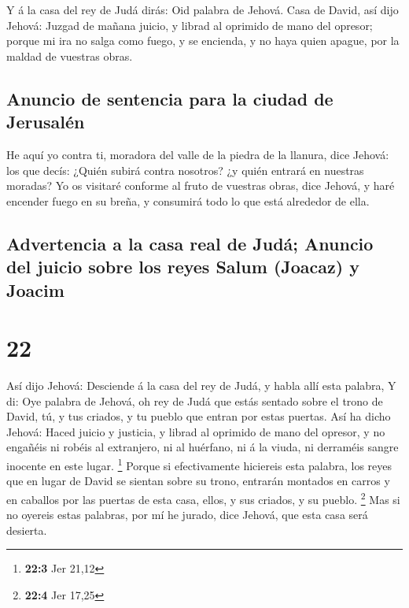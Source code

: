  Y á la casa del rey de Judá dirás: Oid palabra de Jehová.
 Casa de David, así dijo Jehová: Juzgad de mañana juicio, y
librad al oprimido de mano del opresor; porque mi ira no salga como
fuego, y se encienda, y no haya quien apague, por la maldad de vuestras
obras.

\hypertarget{anuncio-de-sentencia-para-la-ciudad-de-jerusaluxe9n}{%
\subsection{Anuncio de sentencia para la ciudad de
Jerusalén}\label{anuncio-de-sentencia-para-la-ciudad-de-jerusaluxe9n}}

 He aquí yo contra ti, moradora del valle de la piedra de
la llanura, dice Jehová: los que decís: ¿Quién subirá contra nosotros?
¿y quién entrará en nuestras moradas?  Yo os visitaré
conforme al fruto de vuestras obras, dice Jehová, y haré encender fuego
en su breña, y consumirá todo lo que está alrededor de ella.

\hypertarget{advertencia-a-la-casa-real-de-juduxe1-anuncio-del-juicio-sobre-los-reyes-salum-joacaz-y-joacim}{%
\subsection{Advertencia a la casa real de Judá; Anuncio del juicio sobre
los reyes Salum (Joacaz) y
Joacim}\label{advertencia-a-la-casa-real-de-juduxe1-anuncio-del-juicio-sobre-los-reyes-salum-joacaz-y-joacim}}

\hypertarget{section-21}{%
\section{22}\label{section-21}}

 Así dijo Jehová: Desciende á la casa del rey de Judá, y
habla allí esta palabra,  Y di: Oye palabra de Jehová, oh
rey de Judá que estás sentado sobre el trono de David, tú, y tus
criados, y tu pueblo que entran por estas puertas.  Así ha
dicho Jehová: Haced juicio y justicia, y librad al oprimido de mano del
opresor, y no engañéis ni robéis al extranjero, ni al huérfano, ni á la
viuda, ni derraméis sangre inocente en este lugar. \footnote{\textbf{22:3}
  Jer 21,12}  Porque si efectivamente hiciereis esta
palabra, los reyes que en lugar de David se sientan sobre su trono,
entrarán montados en carros y en caballos por las puertas de esta casa,
ellos, y sus criados, y su pueblo. \footnote{\textbf{22:4} Jer 17,25}
 Mas si no oyereis estas palabras, por mí he jurado, dice
Jehová, que esta casa será desierta.

